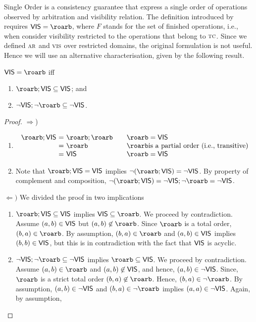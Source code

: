 Single Order is a consistency guarantee that express a single order of operations observed by arbitration and visibility relation. The definition introduced by \cite{} requires 
$\ovis = \roarb$, where $F$ stands for the set of finished operations, i.e., when consider visibility restricted to the operations that belong to $\textsc{\scriptsize{TC}}$. 
Since we defined $\textsc{\scriptsize{AR}}$ and $\textsc{\scriptsize{VIS}}$ over restricted domains, the original formulation is not useful. Hence we will use an alternative characterisation, given by the 
following result.

\begin{lemma} $\ovis = \roarb$ iff 
\begin{enumerate}
   \item $\roarb;\ovis \subseteq \ovis$; and
   \item $\neg\ovis;\neg\roarb \subseteq \neg\ovis$.
\end{enumerate}
\end{lemma}

\begin{proof} $\Rightarrow$) 
\begin{enumerate}
\item
	\[ \begin{array}{l@{\ =\ }l@{\qquad}l}
		\roarb;\ovis &  \roarb;\roarb & \roarb =\ovis\\
		& \roarb & \roarb \mbox{is a partial order (i.e., transitive)}\\
		&  \ovis & \roarb =\ovis
   	\end{array}
	\]
\item Note that  $\roarb;\ovis =\ovis$ implies $\neg(\roarb;\ovis) =\neg\ovis$. By property of complement and composition, $\neg(\roarb;\ovis) =\neg\ovis;\neg\roarb =\neg\ovis$. 
\end{enumerate}

$\Leftarrow)$ We divided the proof in two implications
 \begin{enumerate}
    \item  $\roarb;\ovis \subseteq \ovis$ implies $\ovis\subseteq \roarb$. We proceed by contradiction. Assume $(a,b)\in\mathsf{\scriptsize{VIS}}$ but $(a,b)\not\in\roarb$.
    Since $\roarb$ is a total order, $(b,a)\in\roarb$. By assumption, $(b,a)\in\roarb$ and $(a,b)\in\mathsf{\scriptsize{VIS}}$ implies $(b,b)\in\mathsf{\scriptsize{VIS}}$, but this is in contradiction 
    with the fact that $\mathsf{\scriptsize{VIS}}$ is acyclic. 
        
    \item $\neg\ovis;\neg\roarb \subseteq \neg\ovis$ implies $\roarb\subseteq\ovis$. We proceed by contradiction. 
    Assume $(a,b)\in\roarb$ and $(a,b)\not\in\mathsf{\scriptsize{VIS}}$, and hence,  $(a,b)\in\neg\mathsf{\scriptsize{VIS}}$. Since,
    $\roarb$ is a strict total order $(b,a)\not\in\roarb$. Hence, $(b,a)\in\neg\roarb$. By assumption, $(a,b)\in\neg\mathsf{\scriptsize{VIS}}$ and $(b,a)\in\neg\roarb$ implies $(a,a)\in\neg\mathsf{\scriptsize{VIS}}$.
    Again, by assumption, 
 \end{enumerate}

\end{proof}

